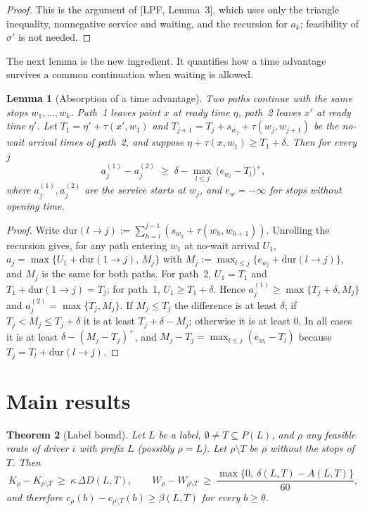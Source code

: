 \documentclass[11pt]{article}
\newtheorem{theorem}{Theorem}
\newtheorem{lemma}[theorem]{Lemma}
\theoremstyle{definition}
\theoremstyle{remark}
\newcommand{\thl}{\underline{\theta}}
\newcommand{\0}{\mathbf{0}}
\begin{document}
\begin{proof}
This is the argument of [LPF, Lemma~3], which uses only the triangle inequality, nonnegative
service and waiting, and the recursion for $a_k$; feasibility of $\sigma'$ is not needed.
\end{proof}

The next lemma is the new ingredient. It quantifies how a time advantage survives a common
continuation when waiting is allowed.

\begin{lemma}[Absorption of a time advantage]\label{lem:absorb}
Two paths continue with the same stops $w_1,\dots,w_k$. Path~1 leaves point $x$ at ready time
$\eta$, path~2 leaves $x'$ at ready time $\eta'$. Let
$T_1=\eta'+\tau(x',w_1)$ and $T_{j+1}=T_j+s_{w_j}+\tau(w_j,w_{j+1})$ be the no-wait arrival
times of path~2, and suppose $\eta+\tau(x,w_1)\ge T_1+\delta$. Then for every $j$
\[
a^{(1)}_j-a^{(2)}_j\;\ge\;\delta-\max_{l\le j}\,\bigl(e_{w_l}-T_l\bigr)^+ ,
\]
where $a^{(1)}_j,a^{(2)}_j$ are the service starts at $w_j$, and $e_{w}=-\infty$ for stops without
opening time.
\end{lemma}

\begin{proof}
Write $\mathrm{dur}(l\to j):=\sum_{h=l}^{j-1}(s_{w_h}+\tau(w_h,w_{h+1}))$. Unrolling the recursion
gives, for any path entering $w_1$ at no-wait arrival $U_1$,
$a_j=\max\{U_1+\mathrm{dur}(1\to j),\,M_j\}$ with $M_j:=\max_{l\le j}\{e_{w_l}+\mathrm{dur}(l\to j)\}$,
and $M_j$ is the same for both paths. For path~2, $U_1=T_1$ and
$T_1+\mathrm{dur}(1\to j)=T_j$; for path~1, $U_1\ge T_1+\delta$. Hence
$a^{(1)}_j\ge\max\{T_j+\delta,M_j\}$ and $a^{(2)}_j=\max\{T_j,M_j\}$. If $M_j\le T_j$ the difference
is at least $\delta$; if $T_j<M_j\le T_j+\delta$ it is at least $T_j+\delta-M_j$; otherwise it is
at least $0$. In all cases it is at least $\delta-(M_j-T_j)^+$, and
$M_j-T_j=\max_{l\le j}(e_{w_l}-T_l)$ because $T_j=T_l+\mathrm{dur}(l\to j)$.
\end{proof}

\section{Main results}

\begin{theorem}[Label bound]\label{thm:bound}
Let $L$ be a label, $\emptyset\ne T\subseteq P(L)$, and $\rho$ any \emph{feasible} route of driver
$i$ with prefix $L$ (possibly $\rho=L$). Let $\rho\setminus T$ be $\rho$ without the stops of $T$. Then
\[
K_\rho-K_{\rho\setminus T}\ \ge\ \kappa\,\Delta D(L,T),\qquad
W_\rho-W_{\rho\setminus T}\ \ge\ \frac{\max\{0,\ \delta(L,T)-A(L,T)\}}{60},
\]
and therefore $c_\rho(b)-c_{\rho\setminus T}(b)\ge\beta(L,T)$ for every $b\ge\thl$.
\end{theorem}
\end{document}
